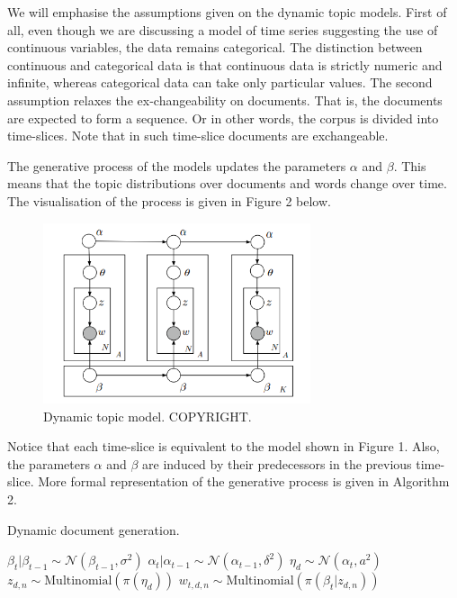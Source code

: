 \documentclass{mprop}
\begin{document}
\par We will emphasise the assumptions given on the dynamic topic models. First of all, even though we are discussing a model of time series suggesting the use of continuous variables, the data remains categorical. The distinction between continuous and categorical data is that continuous data is strictly numeric and infinite, whereas categorical data can take only particular values. The second assumption relaxes the ex-changeability on documents. That is, the documents are expected to form a sequence. Or in other words, the corpus is divided into time-slices. Note that in such time-slice documents are exchangeable.  

\par The generative process of the models updates the parameters $\alpha$ and $\beta$. This means that the topic distributions over documents and words change over time. The visualisation of the process is given in Figure 2 below.
\begin{figure}[H]
  \centering
  \includegraphics[width=0.7\textwidth]{dynamic_topic_model}
  \caption{Dynamic topic model. COPYRIGHT.}
  \label{fig:dtm}
\end{figure}
Notice that each time-slice is equivalent to the model shown in Figure 1. Also, the parameters $\alpha$ and $\beta$ are induced by their predecessors in the previous time-slice. More formal representation of the generative process is given in Algorithm 2. 
\begin{algorithm}[H]
\caption{Dynamic document generation.}
\label{alg:dynamic_document_generation}
\begin{algorithmic}[2]
\State $\beta_t | \beta_{t-1} \sim \mathcal{N}(\beta_{t-1}, \sigma^2)$
\State $\alpha_t | \alpha_{t-1} \sim \mathcal{N}(\alpha_{t-1}, \delta^2)$
\State $\eta_d \sim \mathcal{N}(\alpha_{t}, a^2)$
\State $z_{d, n} \sim \mbox{Multinomial}(\pi(\eta_d))$
\State $w_{t, d, n} \sim \mbox{Multinomial}(\pi(\beta_t | z_{d, n}))$
\EndFor
\EndFor
\end{algorithmic}
\end{algorithm}
\end{document}
